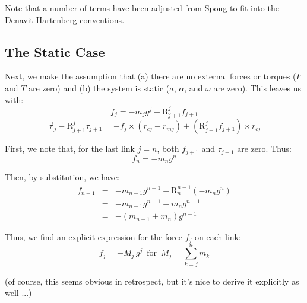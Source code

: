 \documentclass[letterpaper,12pt]{article}
\newcommand{\R}[2]{{\mbox{R}}^{#1}_{#2}}
\begin{document}
   \noindent
   Note that a number of terms have been adjusted from Spong to fit into
   the Denavit-Hartenberg conventions.
   
   \subsection{The Static Case}
   
      Next, we make the assumption that (a) there are no external
      forces or torques ($F$ and $T$ are zero)
      and (b) the system is static ($a$, $\alpha$, and $\omega$ are zero).
      This leaves us with:
      \begin{equation} \label{eqn:static-f}
         f_j = - m_j g^j + \R{j}{j+1} f_{j+1}
      \end{equation}
      \begin{equation}
         \vec\tau_j - \R{j}{j+1} \tau_{j+1}
            = - f_j \times \left( r_{cj} - r_{mj} \right)
            + \left( \R{j}{j+1} f_{j+1} \right) \times r_{cj}
      \end{equation}
      
      \noindent
      First, we note that, for the last link $j=n$,
      both $f_{j+1}$ and $\tau_{j+1}$ are zero.  Thus:
      \begin{equation}
         f_n = - m_n g^n
      \end{equation}
      
      \noindent
      Then, by substitution, we have:
      \begin{eqnarray}
         f_{n-1} &=& - m_{n-1} g^{n-1}
            + \R{n-1}{n} \left( - m_n g^n \right) \\
                 &=& - m_{n-1} g^{n-1} - m_n g^{n-1} \\
                 &=& - \left( m_{n-1} + m_n \right) g^{n-1}
      \end{eqnarray}
      
      \noindent
      Thus, we find an explicit expression for the force $f_j$ on each
      link:
      \begin{equation}
         f_j = - M_j \, g^j
            \,\,\,\mbox{for}\,\,\,
            M_j = \sum_{k=j}^n m_k
      \end{equation}
      
      \noindent
      (of course, this seems obvious in retrospect, but it's nice to derive
      it explicitly as well ...)
      
\end{document}

